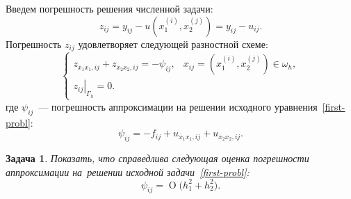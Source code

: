 \documentclass[11pt,a4paper,twoside,listtotoc,bibtotoc]{report}
\numberwithin{equation}{section}
\newtheorem*{problem}{Задача}
\theoremstyle{definition}
\theoremstyle{plain}
\newcommand{\bigO}[1]{\ensuremath{\operatorname{O}\bigl(#1\bigr)}}
\begin{document}
\vspace{0.5em}
\begin{figure}[H]
\centering
{}
\end{figure}

\noindent
Введем погрешность решения численной задачи:
%
$$
    z_{ij} = y_{ij} - u\left(x_1^{(i)}, x_2^{(j)}\right) = y_{ij} - u_{ij}.
$$
%
Погрешность $z_{ij}$ удовлетворяет следующей разностной схеме:
%
$$
    \begin{cases}
        z_{\overline{x}_1x_1,ij}+z_{\overline{x}_2x_2,ij}=-\psi_{ij}, &
            x_{ij} = \left(x_1^{(i)}, x_2^{(j)}\right) \in \omega_h,\\
        \left.z_{ij}\right\vert_{\Gamma_h} = 0. &
    \end{cases}
$$
%
где $\psi_{ij}$~— погрешность аппроксимации на решении
исходного уравнения~\eqref{first-probl}:
%
$$
    \psi_{ij} = -f_{ij} + u_{\overline{x}_1x_1,ij} + u_{\overline{x}_2x_2,ij}.
$$
%
%
\begin{problem}
    Показать, что справедлива следующая оценка погрешности аппроксимации
    на~решении исходной задачи~\eqref{first-probl}:
    $$
        \psi_{ij} = \bigO{h_1^2 + h_2^2}.
    $$
\end{problem}
%
%
\end{document}
